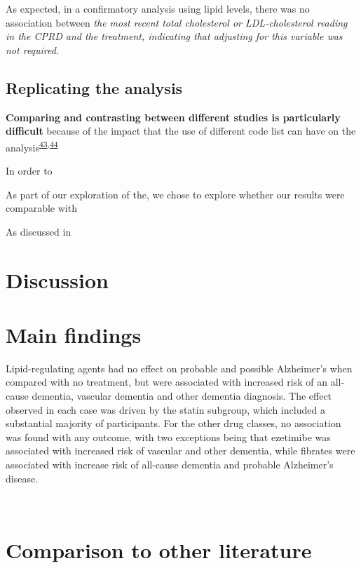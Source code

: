 \documentclass[a4paper, twoside]{templates/ociamthesis}
\begin{document}
As expected, in a confirmatory analysis using lipid levels, there was no association between \emph{the most recent total cholesterol or LDL-cholesterol reading in the CPRD and the treatment, indicating that adjusting for this variable was not required.}

\hypertarget{replicating-the-analysis}{%
\subsection{Replicating the analysis}\label{replicating-the-analysis}}

\textbf{Comparing and contrasting between different studies is particularly difficult} because of the impact that the use of different code list can have on the analysis\textsuperscript{\protect\hyperlink{ref-wilkinson2018a}{43},\protect\hyperlink{ref-mcguinness2019c}{44}}

In order to

As part of our exploration of the, we chose to explore whether our results were comparable with

As discussed in

\hypertarget{discussion-2}{%
\section{Discussion}\label{discussion-2}}

\hypertarget{main-findings}{%
\section{Main findings}\label{main-findings}}

Lipid-regulating agents had no effect on probable and possible Alzheimer's when compared with no treatment, but were associated with increased risk of an all-cause dementia, vascular dementia and other dementia diagnosis. The effect observed in each case was driven by the statin subgroup, which included a substantial majority of participants. For the other drug classes, no association was found with any outcome, with two exceptions being that ezetimibe was associated with increased risk of vascular and other dementia, while fibrates were associated with increase risk of all-cause dementia and probable Alzheimer's disease.

~

\hypertarget{comparison-to-other-literature}{%
\section{Comparison to other literature}\label{comparison-to-other-literature}}
\end{document}
